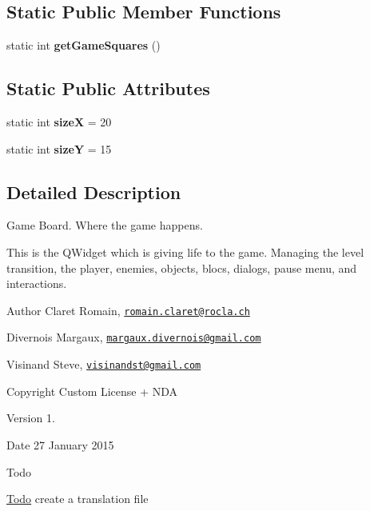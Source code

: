 \subsection*{Static Public Member Functions}
\begin{DoxyCompactItemize}
\item 
\hypertarget{class_gameboard_aa10ed162ff321f4fe480e531ef352bd8}{}static int {\bfseries get\+Game\+Squares} ()\label{class_gameboard_aa10ed162ff321f4fe480e531ef352bd8}

\end{DoxyCompactItemize}
\subsection*{Static Public Attributes}
\begin{DoxyCompactItemize}
\item 
\hypertarget{class_gameboard_a50499cde2f942a0d18d261a7103e1e2a}{}static int {\bfseries size\+X} = 20\label{class_gameboard_a50499cde2f942a0d18d261a7103e1e2a}

\item 
\hypertarget{class_gameboard_a1a60c1746c1bfa669b3bf7b3dfc6534d}{}static int {\bfseries size\+Y} = 15\label{class_gameboard_a1a60c1746c1bfa669b3bf7b3dfc6534d}

\end{DoxyCompactItemize}


\subsection{Detailed Description}
Game Board. Where the game happens. 

This is the Q\+Widget which is giving life to the game. Managing the level transition, the player, enemies, objects, blocs, dialogs, pause menu, and interactions. \begin{DoxyAuthor}{Author}
Claret Romain, \href{mailto:romain.claret@rocla.ch}{\tt romain.\+claret@rocla.\+ch} 

Divernois Margaux, \href{mailto:margaux.divernois@gmail.com}{\tt margaux.\+divernois@gmail.\+com} 

Visinand Steve, \href{mailto:visinandst@gmail.com}{\tt visinandst@gmail.\+com} 
\end{DoxyAuthor}
\begin{DoxyCopyright}{Copyright}
Custom License + N\+D\+A 
\end{DoxyCopyright}
\begin{DoxyVersion}{Version}
1. 
\end{DoxyVersion}
\begin{DoxyDate}{Date}
27 January 2015 
\end{DoxyDate}
\begin{DoxyRefDesc}{Todo}
\item[\hyperlink{todo__todo000008}{Todo}]create a translation file \end{DoxyRefDesc}


